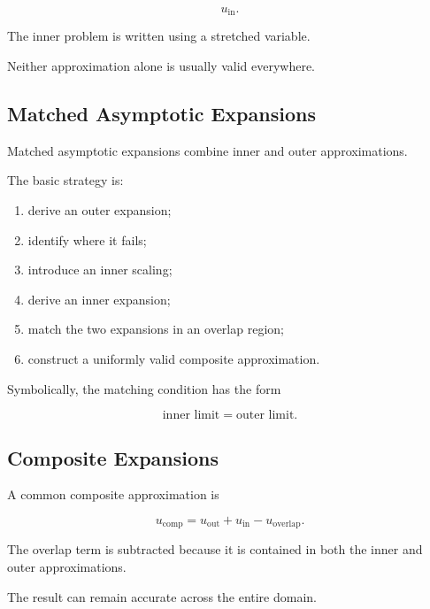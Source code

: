 \[
\boxed{
u_{\mathrm{in}}.
}
\]

The inner problem is written using a stretched variable.

Neither approximation alone is usually valid everywhere.

\subsection{Matched Asymptotic Expansions}
\label{subsec:matched-asymptotic-expansions}

Matched asymptotic expansions combine inner and outer approximations.

The basic strategy is:

\begin{enumerate}
    \item derive an outer expansion;
    \item identify where it fails;
    \item introduce an inner scaling;
    \item derive an inner expansion;
    \item match the two expansions in an overlap region;
    \item construct a uniformly valid composite approximation.
\end{enumerate}

Symbolically, the matching condition has the form

\[
\boxed{
\text{inner limit}
=
\text{outer limit}.
}
\]

\subsection{Composite Expansions}
\label{subsec:composite-expansions}

A common composite approximation is

\[
\boxed{
u_{\mathrm{comp}}
=
u_{\mathrm{out}}
+
u_{\mathrm{in}}
-
u_{\mathrm{overlap}}.
}
\]

The overlap term is subtracted because it is contained in both the inner
and outer approximations.

The result can remain accurate across the entire domain.

